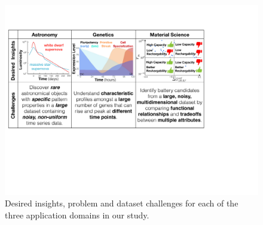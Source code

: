 \begin{figure}[h!]
    \centering
    \includegraphics[width=0.9\linewidth]{figures/science_goal.pdf}
    \caption{Desired insights, problem and dataset challenges for each of the three application domains in our study.}
    \label{science_goal}
    \vspace*{-20pt}
   \end{figure}
